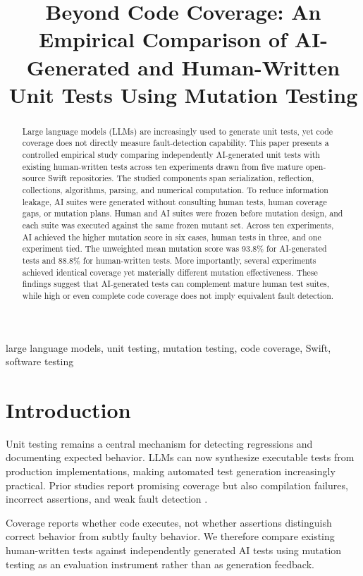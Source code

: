 \documentclass[10pt,conference]{IEEEtran}
\title{Beyond Code Coverage: An Empirical Comparison of AI-Generated and Human-Written Unit Tests Using Mutation Testing}
\author{\IEEEauthorblockN{Author(s) to be added}
\IEEEauthorblockA{Affiliation to be added}}
\begin{document}
\maketitle

\begin{abstract}
Large language models (LLMs) are increasingly used to generate unit tests, yet code coverage does not directly measure fault-detection capability. This paper presents a controlled empirical study comparing independently AI-generated unit tests with existing human-written tests across ten experiments drawn from five mature open-source Swift repositories. The studied components span serialization, reflection, collections, algorithms, parsing, and numerical computation. To reduce information leakage, AI suites were generated without consulting human tests, human coverage gaps, or mutation plans. Human and AI suites were frozen before mutation design, and each suite was executed against the same frozen mutant set. Across ten experiments, AI achieved the higher mutation score in six cases, human tests in three, and one experiment tied. The unweighted mean mutation score was 93.8\% for AI-generated tests and 88.8\% for human-written tests. More importantly, several experiments achieved identical coverage yet materially different mutation effectiveness. These findings suggest that AI-generated tests can complement mature human test suites, while high or even complete code coverage does not imply equivalent fault detection.
\end{abstract}

\begin{IEEEkeywords}
large language models, unit testing, mutation testing, code coverage, Swift, software testing
\end{IEEEkeywords}

\section{Introduction}
Unit testing remains a central mechanism for detecting regressions and documenting expected behavior. LLMs can now synthesize executable tests from production implementations, making automated test generation increasingly practical. Prior studies report promising coverage but also compilation failures, incorrect assertions, and weak fault detection \cite{yuan2023}.

Coverage reports whether code executes, not whether assertions distinguish correct behavior from subtly faulty behavior. We therefore compare existing human-written tests against independently generated AI tests using mutation testing as an evaluation instrument rather than as generation feedback.
\end{document}
